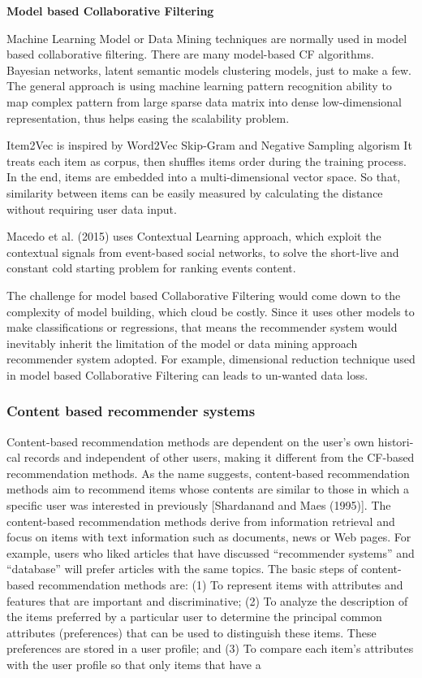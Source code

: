\bigskip
\textbf{Model based Collaborative Filtering}

Machine Learning Model or Data Mining techniques are normally used in model based collaborative filtering. There are many model-based CF algorithms. Bayesian networks, latent semantic models clustering models, just to make a few. The general approach is using machine learning pattern recognition ability to map complex pattern from large sparse data matrix into dense low-dimensional representation, thus helps easing the scalability problem.  

Item2Vec \citep{barkan2016item2vec} is inspired by Word2Vec \citep{mikolov2013distributed} Skip-Gram and Negative Sampling algorism It treats each item as corpus, then shuffles items order during the training process. In the end, items are embedded into a multi-dimensional vector space. So that, similarity between items can be easily measured by calculating the distance without requiring user data input.  

Macedo et al. (2015) uses Contextual Learning approach, which exploit the contextual signals from event-based social networks, to solve the short-live and constant cold starting problem for ranking events content. 

The challenge for model based Collaborative Filtering would come down to the complexity of model building, which cloud be costly.  Since it uses other models to make classifications or regressions, that means the recommender system would inevitably inherit the limitation of the model or data mining approach recommender system adopted. For example, dimensional reduction technique used in model based Collaborative Filtering can leads to un-wanted data loss. 
 


\bigskip
\subsubsection{Content based recommender systems}

Content-based recommendation methods are dependent on the user’s own histori- cal records and independent of other users, making it different from the CF-based recommendation methods. As the name suggests, content-based recommendation methods aim to recommend items whose contents are similar to those in which a specific user was interested in previously [Shardanand and Maes (1995)]. The content-based recommendation methods derive from information retrieval and focus on items with text information such as documents, news or Web pages. For example, users who liked articles that have discussed “recommender systems” and “database” will prefer articles with the same topics. The basic steps of content-based recommendation methods are: (1) To
represent items with attributes and features that are important and discriminative; (2) To analyze the description of the items preferred by a particular user to determine the principal common attributes (preferences) that can be used to distinguish these items. These preferences are stored in a user profile; and (3) To compare each item’s attributes with the user profile so that only items that have a

